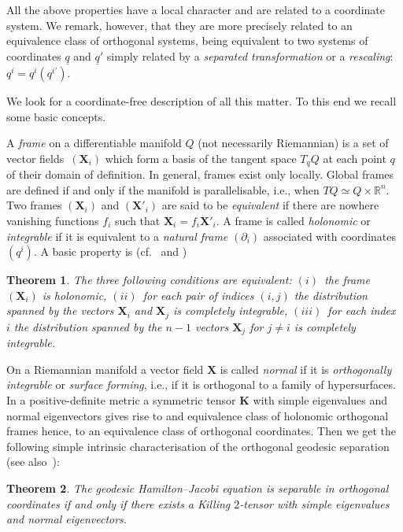 \documentclass[pdftex]{sigma}
\def\bs{\boldsymbol}
\numberwithin{equation}{section}
\newtheorem{Theorem}{Theorem}[section]
 { \theoremstyle{definition}
\newtheorem{Notation}[Theorem]{Notation}
\newtheorem{Example}[Theorem]{Example}
\newtheorem{Remark}[Theorem]{Remark}
\newtheorem{Remarks}[Theorem]{Remarks}
 }
\begin{document}
All the above properties have a local character and are related to a coordinate system. We remark, however, that they are more precisely related to an equivalence class of orthogonal systems, being equivalent to two systems of coordinates $\underline q$ and $\underline q'$ simply related by a {\it separated transformation} or a {\it rescaling}: $q^i=q^i(q^{i'})$.

We look for a coordinate-free description of all this matter. To this end we recall some basic concepts.

A {\it frame} on a dif\/ferentiable manifold $Q$ (not necessarily Riemannian) is a set of vector f\/ields~$(\bs X_i)$ which form a basis of the tangent space $T_qQ$ at each point $q$ of their domain of def\/inition. In general, frames exist only locally. Global frames are def\/ined if and only if the manifold is parallelisable, i.e., when $TQ\simeq Q\times \mathbb R^n$. Two frames $(\bs X_i)$ and $(\bs X'_i)$ are said to be {\it equivalent} if there are nowhere vanishing functions $f_i$ such that $\bs X_i=f_i\bs X'_i$. A frame is called {\it holonomic} or {\it integrable} if it is equivalent to a {\it natural frame} $(\partial_i)$ associated with coordinates~$(q^i)$.
A basic property is  (cf.\ \cite{Schouten-1954} and \cite{BCR-2002a})

\begin{Theorem}\label{t:3.1}
The three following conditions are equivalent:
$(i)$~the frame $(\bs X_i)$ is holonomic, $(ii)$~for each pair of indices $(i,j)$ the distribution spanned by the vectors $\bs X_i$ and $\bs X_j$ is completely integrable, $(iii)$~for each index $i$ the distribution spanned by the $n-1$ vectors $\bs X_j$ for $j\neq i$ is completely integrable.
\end{Theorem}

On a Riemannian manifold a vector f\/ield $\bs X$ is called {\it normal} if it is {\it orthogonally integrable} or {\it surface forming}, i.e., if it is orthogonal to a family of hypersurfaces. In a positive-def\/inite metric a symmetric tensor $\bs K$ with simple eigenvalues and normal eigenvectors gives rise to and equivalence class of holonomic orthogonal frames hence, to an equivalence class of orthogonal coordinates. Then we get the following simple intrinsic characterisation of the orthogonal geodesic separation \cite[Corollary~4, Section~3]{KM-1980} (see also~\cite{Benenti-1993}):

\begin{Theorem} \label{t:3.2}
The geodesic Hamilton--Jacobi equation is separable in orthogonal coordinates if and only if there exists a Killing $2$-tensor with simple eigenvalues and normal eigenvectors.
\end{Theorem}
\end{document}
